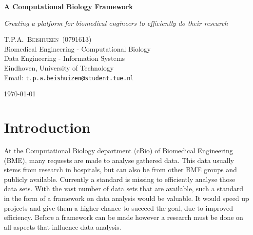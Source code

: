 \documentclass[10pt,a4paper]{article}
\newcommand{\documenttitle}{A Computational Biology Framework}
\newcommand{\documentsubtitle}{Creating a platform for biomedical engineers to efficiently do their research}
\begin{document}
	
	\begin{titlepage}
		
		\center
		
		\vspace*{3cm}
		
		\textbf{\huge \documenttitle}
		
		\textit{\LARGE \documentsubtitle}
		
		\vspace*{2cm}
		
		\large
		\centering
		T.P.A.~\textsc{Beishuizen}~(0791613)\\
		Biomedical Engineering - Computational Biology\\
		Data Engineering - Information Systems\\
		Eindhoven, University of Technology\\
		Email: \texttt{t.p.a.beishuizen@student.tue.nl}
		
		\vfill
		
		\vspace*{1cm}
		
		\today
		
	\end{titlepage}
	
	\tableofcontents
	
	
	\pagestyle{fancy}
	\fancyhead{} %
	\fancyfoot{} %
	\renewcommand{\headrulewidth}{0.4pt}
	\renewcommand{\footrulewidth}{0.4pt}
	
	\fancyhead[L]{\rightmark}
	\fancyfoot[C]{\thepage}
	
	
	\clearpage
	
	\section{Introduction}
	\label{sec:Introduction}
	
	At the Computational Biology department (cBio) of Biomedical Engineering (BME), many requests are made to analyse gathered data. This data usually stems from research in hospitals, but can also be from other BME groups and publicly available. Currently a standard is missing to efficiently analyse those data sets. With the vast number of data sets that are available, such a standard in the form of a framework on data analysis would be valuable. It would speed up projects and give them a higher chance to succeed the goal, due to improved efficiency. Before a framework can be made however a research must be done on all aspects that influence data analysis.
	
\end{document}
